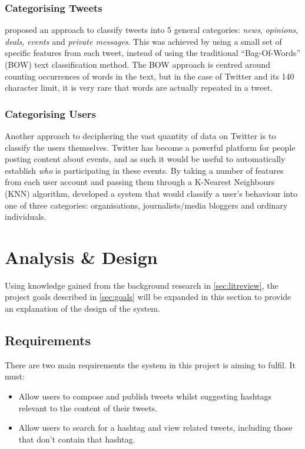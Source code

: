 \documentclass[12pt,a4paper]{article}
\begin{document}
\subsubsection{Categorising Tweets}
\textcite{Sriram:2010} proposed an approach to classify tweets into 5 general categories: \emph{news}, \emph{opinions}, \emph{deals}, \emph{events} and \emph{private messages}. This was achieved by using a small set of specific features from each tweet, instead of using the traditional ``Bag-Of-Words'' (BOW) text classification method. The BOW approach is centred around counting occurrences of words in the text, but in the case of Twitter and its 140 character limit, it is very rare that words are actually repeated in a tweet.

\subsubsection{Categorising Users}
Another approach to deciphering the vast quantity of data on Twitter is to classify the users themselves. Twitter has become a powerful platform for people posting content about events, and as such it would be useful to automatically establish \emph{who} is participating in these events. By taking a number of features from each user account and passing them through a K-Nearest Neighbours (KNN) algorithm, \textcite{DeChoudhury:2012} developed a system that would classify a user's behaviour into one of three categories: organisations, journalists/media bloggers and ordinary individuals.

\pagebreak

\section{Analysis \& Design}
Using knowledge gained from the background research in \autoref{sec:litreview}, the project goals described in \autoref{sec:goals} will be expanded in this section to provide an explanation of the design of the system.

\subsection{Requirements}
There are two main requirements the system in this project is aiming to fulfil. It must:
\begin{itemize}
    \item Allow users to compose and publish tweets whilst suggesting hashtags relevant to the content of their tweets.
    \item Allow users to search for a hashtag and view related tweets, including those that don't contain that hashtag.
\end{itemize}
\end{document}
